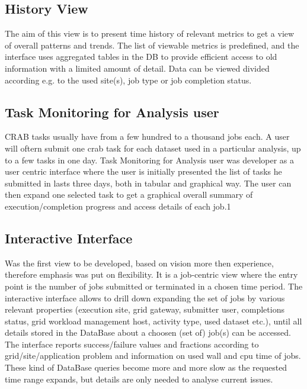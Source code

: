 \subsection{History View}
The aim of this view is to present time history of relevant
metrics to get a view of overall patterns and trends.
The list of viewable metrics is predefined, and
the interface uses aggregated tables in the DB to provide
efficient access to old information with a limited
amount of detail. Data can be viewed divided
according e.g. to the used site(s), job type or job completion status.


\subsection{Task Monitoring for Analysis user}
CRAB tasks usually have from a few hundred
to a thousand jobs each. A user will oftern submit one crab task
for each dataset used in a particular analysis, up to a few
tasks in one day. Task Monitoring for Analysis user was
developer as a user centric interface where the user is
initially presented the list of tasks he submitted in lasts
three days, both in tabular and graphical way.
The user can then expand one selected task to get
a graphical overall summary of execution/completion progress
and access details of each job.1
\subsection{Interactive Interface}
Was the first view to be developed, based on
vision more then experience, therefore
emphasis was put on flexibility. It is a job-centric view
where the entry point is the number of jobs submitted or
terminated in a chosen time period.
The interactive interface
allows to drill down expanding the set of jobs by
various relevant properties (execution site, grid gateway,
submitter user, completions status, grid workload management host,
activity type, used dataset etc.), until all details stored in the DataBase
about a choosen (set of) job(s) can be accessed.
The interface reports success/failure values and fractions
according to grid/site/application problem and information
on used wall and cpu time of jobs.
These kind of DataBase queries become more and more slow as the requested
time range expands, but details are only needed to analyse current issues.


